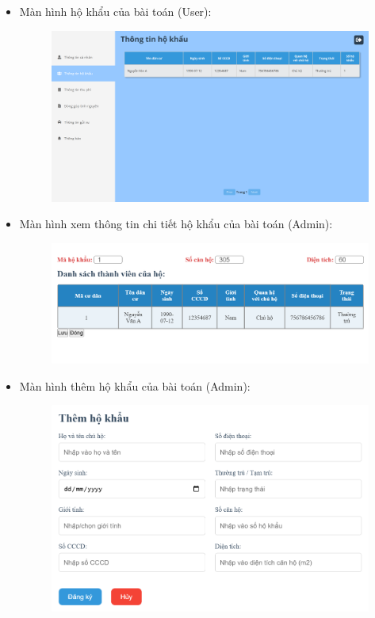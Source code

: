 \documentclass{article}
\begin{document}
\begin{itemize}
\begin{figure}[H]
    \end{figure}
    \newpage
    \item Màn hình hộ khẩu của bài toán (User):
    \begin{figure}[H]
        \centering
        \includegraphics[width=1\textwidth]{Ảnh chương 4/Hộ khẩu 2.png}
    \end{figure}
    \item Màn hình xem thông tin chi tiết hộ khẩu của bài toán (Admin):
    \begin{figure}[H]
        \centering
        \includegraphics[width=1\textwidth]{Ảnh chương 4/Chi tiết hộ khẩu 1.png}
    \end{figure}
    \newpage
    \item Màn hình thêm hộ khẩu của bài toán (Admin):
    \begin{figure}[H]
        \centering
        \includegraphics[width=1\textwidth]{Ảnh chương 4/Thêm hộ khẩu 1.png}

\end{figure}
\end{itemize}
\end{document}

